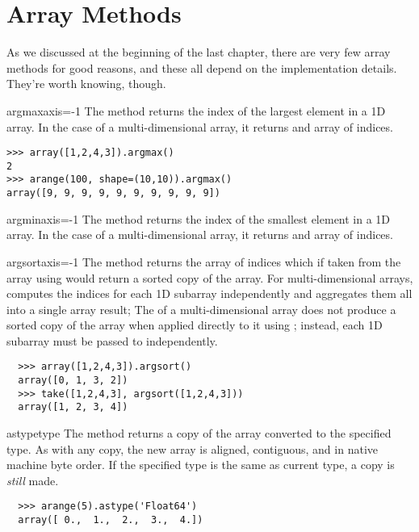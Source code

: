 
\chapter{Array Methods}
\label{cha:array-methods}

As we discussed at the beginning of the last chapter, there are very few array
methods for good reasons, and these all depend on the implementation
details. They're worth knowing, though.

\begin{methoddesc}[numarray]{argmax}{axis=-1}
  \label{arraymethod:argmax}
  The  method returns the index of the largest element in a 1D
  array.  In the case of a multi-dimensional array, it returns and array of
  indices.
\begin{verbatim}
>>> array([1,2,4,3]).argmax()
2
>>> arange(100, shape=(10,10)).argmax()
array([9, 9, 9, 9, 9, 9, 9, 9, 9, 9])
\end{verbatim}
\end{methoddesc}


\begin{methoddesc}[numarray]{argmin}{axis=-1}
  \label{arraymethod:argmin}
  The  method returns the index of the smallest element in a 1D
  array.  In the case of a multi-dimensional array, it returns and array of
  indices.
\end{methoddesc}


\begin{methoddesc}[numarray]{argsort}{axis=-1}
  \label{arraymethod:argsort}
  The  method returns the array of indices which if taken from
  the array using  would return a sorted copy of the array.  For
  multi-dimensional arrays,  computes the indices for each 1D
  subarray independently and aggregates them all into a single array result;
  The  of a multi-dimensional array does not produce a sorted
  copy of the array when applied directly to it using ; instead,
  each 1D subarray must be passed to  independently.
\begin{verbatim}
  >>> array([1,2,4,3]).argsort()
  array([0, 1, 3, 2])
  >>> take([1,2,4,3], argsort([1,2,4,3]))
  array([1, 2, 3, 4])
\end{verbatim}
\end{methoddesc}


\begin{methoddesc}[numarray]{astype}{type}
  \label{arraymethod:astype}
  The  method returns a copy of the array converted to the
  specified type.  As with any copy, the new array is aligned, contiguous, and
  in native machine byte order.  If the specified type is the same as current
  type, a copy is \emph{still} made.
\begin{verbatim}
  >>> arange(5).astype('Float64')
  array([ 0.,  1.,  2.,  3.,  4.])
\end{verbatim}
\end{methoddesc}


